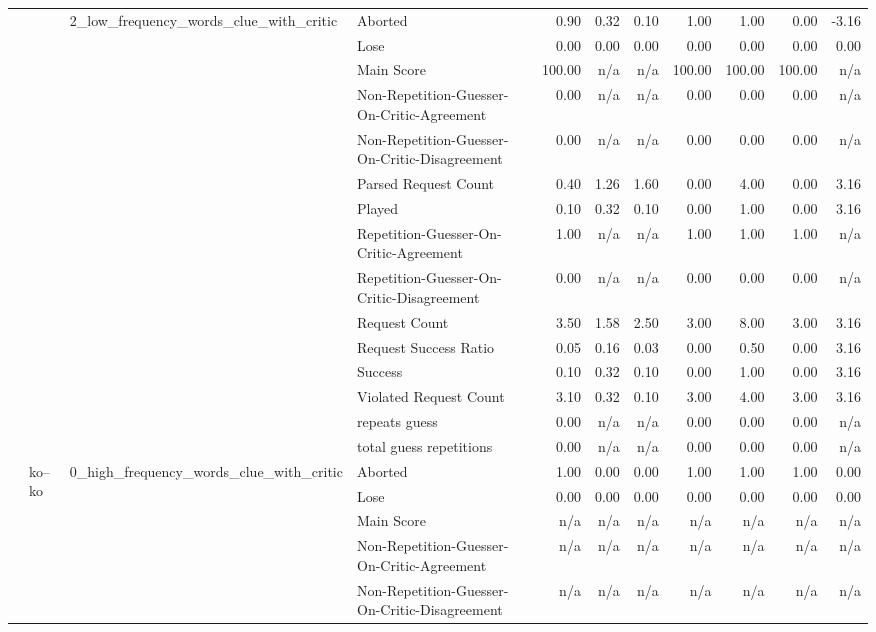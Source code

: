 \begin{tabular}{llllrrrrrrr}
\cline{3-11}
 &  & \multirow[t]{15}{*}{2_low_frequency_words_clue_with_critic} & Aborted & 0.90 & 0.32 & 0.10 & 1.00 & 1.00 & 0.00 & -3.16 \\
 &  &  & Lose & 0.00 & 0.00 & 0.00 & 0.00 & 0.00 & 0.00 & 0.00 \\
 &  &  & Main Score & 100.00 & n/a & n/a & 100.00 & 100.00 & 100.00 & n/a \\
 &  &  & Non-Repetition-Guesser-On-Critic-Agreement & 0.00 & n/a & n/a & 0.00 & 0.00 & 0.00 & n/a \\
 &  &  & Non-Repetition-Guesser-On-Critic-Disagreement & 0.00 & n/a & n/a & 0.00 & 0.00 & 0.00 & n/a \\
 &  &  & Parsed Request Count & 0.40 & 1.26 & 1.60 & 0.00 & 4.00 & 0.00 & 3.16 \\
 &  &  & Played & 0.10 & 0.32 & 0.10 & 0.00 & 1.00 & 0.00 & 3.16 \\
 &  &  & Repetition-Guesser-On-Critic-Agreement & 1.00 & n/a & n/a & 1.00 & 1.00 & 1.00 & n/a \\
 &  &  & Repetition-Guesser-On-Critic-Disagreement & 0.00 & n/a & n/a & 0.00 & 0.00 & 0.00 & n/a \\
 &  &  & Request Count & 3.50 & 1.58 & 2.50 & 3.00 & 8.00 & 3.00 & 3.16 \\
 &  &  & Request Success Ratio & 0.05 & 0.16 & 0.03 & 0.00 & 0.50 & 0.00 & 3.16 \\
 &  &  & Success & 0.10 & 0.32 & 0.10 & 0.00 & 1.00 & 0.00 & 3.16 \\
 &  &  & Violated Request Count & 3.10 & 0.32 & 0.10 & 3.00 & 4.00 & 3.00 & 3.16 \\
 &  &  & repeats guess & 0.00 & n/a & n/a & 0.00 & 0.00 & 0.00 & n/a \\
 &  &  & total guess repetitions & 0.00 & n/a & n/a & 0.00 & 0.00 & 0.00 & n/a \\
\cline{2-11} \cline{3-11}
 & \multirow[t]{45}{*}{ko--ko} & \multirow[t]{15}{*}{0_high_frequency_words_clue_with_critic} & Aborted & 1.00 & 0.00 & 0.00 & 1.00 & 1.00 & 1.00 & 0.00 \\
 &  &  & Lose & 0.00 & 0.00 & 0.00 & 0.00 & 0.00 & 0.00 & 0.00 \\
 &  &  & Main Score & n/a & n/a & n/a & n/a & n/a & n/a & n/a \\
 &  &  & Non-Repetition-Guesser-On-Critic-Agreement & n/a & n/a & n/a & n/a & n/a & n/a & n/a \\
 &  &  & Non-Repetition-Guesser-On-Critic-Disagreement & n/a & n/a & n/a & n/a & n/a & n/a & n/a \\

\end{tabular}

